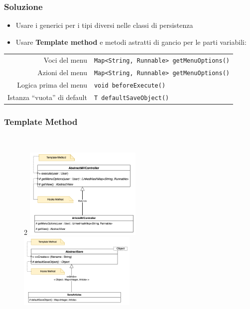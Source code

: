 \begin{frame}
    \frametitle{Soluzione}
    \begin{itemize}
        \item Usare i generici per i tipi diversi nelle classi di persistenza
        \item Usare \textbf{Template method} e metodi astratti di gancio per le parti variabili:
    \end{itemize}

    \begin{center}
        \small
        \begin{tabular}{r|l}
            Voci del menu & \texttt{Map<String, Runnable> getMenuOptions()} \\
            Azioni del menu & \texttt{Map<String, Runnable> getMenuOptions()} \\
            Logica prima del menu & \texttt{void beforeExecute()} \\
            \hline
            Istanza ``vuota'' di default & \texttt{T defaultSaveObject()} \\
        \end{tabular}
    \end{center}
\end{frame}

\begin{frame}
    \frametitle{Template Method}
    \begin{figure}
         
        \begin{multicols} {2}
            \includegraphics[width=0.50\textwidth]{img/templateMethodController.png}
            \columnbreak
            \includegraphics[width=0.50\textwidth]{img/templateMethodSave.png}
        \end{multicols}
    \end{figure}
\end{frame}

